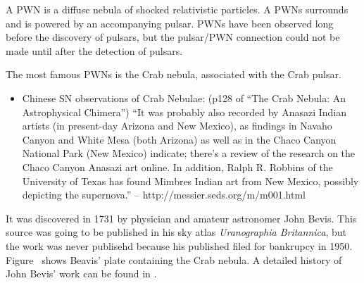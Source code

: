 




A \gls{PWN} is a diffuse nebula of shocked relativistic particles.
A \glspl{PWN} surrounds and is powered by an accompanying pulsar. 
\glspl{PWN} have been observed long before the discovery of pulsars, but
the pulsar/\gls{PWN} connection could not be made until
after the detection of pulsars.

The most famous \glspl{PWN} is the Crab nebula, associated with
the Crab pulsar.

\begin{itemize}
  \item Chinese SN observations of Crab Nebulae: (p128 of ``The Crab Nebula: An Astrophysical Chimera'')
     ``It was probably also recorded by Anasazi Indian artists (in
     present-day Arizona and New Mexico), as findings in Navaho Canyon and
     White Mesa (both Arizona) as well as in the Chaco Canyon National
     Park (New Mexico) indicate; there's a review of the research on
     the Chaco Canyon Anasazi art online. In addition, Ralph R. Robbins
     of the University of Texas has found Mimbres Indian art from New
     Mexico, possibly depicting the supernova.'' -- http://messier.seds.org/m/m001.html
\end{itemize}

It was discovered in
1731 by physician and amateur astronomer John Bevis.  This source was
going to be published in his sky atlas {\em Uranographia Britannica}, but
the work was never publisehd because his published filed for bankrupcy
in 1950.  Figure~ shows Beavis' plate containing
the Crab nebula.  A detailed history of John Bevis' work can be found
in \cite{ashworth_1981_bevis-uranographia}.


